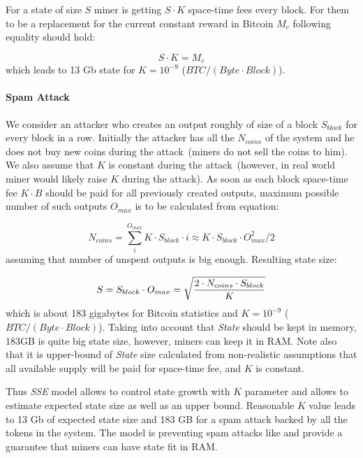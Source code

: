 \documentclass[]{llncs}   %
\newcommand{\esse}{\textit{SSE}}
\newcommand{\state}{\textit{State}}
\begin{document}
For a state of size $S$ miner is getting $S \cdot K$ space-time fees every block. For them to be a replacement for the current constant reward in Bitcoin $M_c$ following equality should hold:

\begin{equation}
\label{eq:statesizeexp}
S \cdot K = M_c
\end{equation}
which leads to 13 Gb state for $K=10^{-9}$ ($BTC / (Byte \cdot Block)$).


\paragraph{Spam Attack}

We consider an attacker who creates an output roughly of size of a block $S_{block}$ for every block in a row. Initially the attacker has all the $N_{coins}$ of the system and he does not buy new coins during the attack~(miners do not sell the coins to him). We also assume that $K$ is constant during the attack~(however, in real world miner would likely raise $K$ during the attack). As soon as each block space-time fee $K \cdot B$ should be paid for all previously created outputs, maximum possible number of such outputs $O_{max}$ is to be calculated from equation:

\begin{equation}
N_{coins} = \sum_i^{O_{max}}{K \cdot S_{block} \cdot i} \approx K \cdot S_{block} \cdot O_{max}^2 / 2
\end{equation}
assuming that number of unspent outputs is big enough. Resulting state size: 

\begin{equation}
\label{eq:statesizemax}
S = S_{block} \cdot O_{max} = \sqrt { 2 \cdot N_{coins} \cdot S_{block} \over K}
\end{equation}
which is about 183 gigabytes for Bitcoin statistics and $K=10^{-9}$ ($BTC / (Byte \cdot Block)$). Taking into account that \state{} should be kept in memory, 183GB is quite big state size, however, miners can keep it in RAM. Note also that it is upper-bound of \state{} size calculated from non-realistic assumptions that all available supply will be paid for space-time fee, and $K$ is constant.

Thus \esse{} model allows to control state growth with $K$ parameter and allows to estimate expected state size as well as an upper bound. Reasonable $K$ value leads to 13 Gb of expected state size and 183 GB for a spam attack backed by all the tokens in the system. The model is preventing spam attacks like \cite{bitcoin2015flood} and provide a guarantee that miners can have state fit in RAM.
\end{document}
